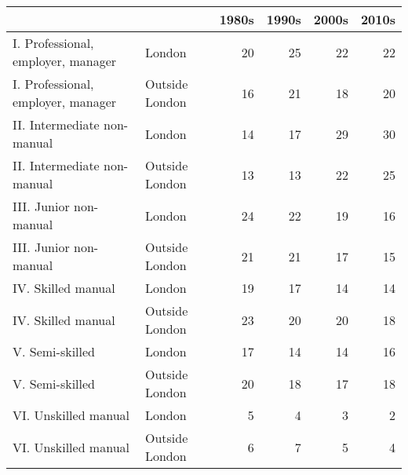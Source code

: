 \begin{table}[ht]
\centering
\begin{tabular}{llrrrr}
  \hline
 &  & 1980s & 1990s & 2000s & 2010s \\ 
  \hline
I. Professional, employer, manager & London & 20 & 25 & 22 & 22 \\ 
  I. Professional, employer, manager & Outside London & 16 & 21 & 18 & 20 \\ 
  II. Intermediate non-manual & London & 14 & 17 & 29 & 30 \\ 
  II. Intermediate non-manual & Outside London & 13 & 13 & 22 & 25 \\ 
  III. Junior non-manual & London & 24 & 22 & 19 & 16 \\ 
  III. Junior non-manual & Outside London & 21 & 21 & 17 & 15 \\ 
  IV. Skilled manual & London & 19 & 17 & 14 & 14 \\ 
  IV. Skilled manual & Outside London & 23 & 20 & 20 & 18 \\ 
  V. Semi-skilled & London & 17 & 14 & 14 & 16 \\ 
  V. Semi-skilled & Outside London & 20 & 18 & 17 & 18 \\ 
  VI. Unskilled manual & London & 5 & 4 & 3 & 2 \\ 
  VI. Unskilled manual & Outside London & 6 & 7 & 5 & 4 \\ 
   \hline
\end{tabular}
\end{table}
